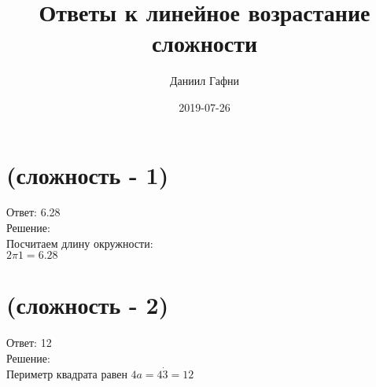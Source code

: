 \documentclass{article}%
\title{Ответы к линейное возрастание сложности}%
\author{Даниил Гафни}%
\date{2019{-}07{-}26}%
\begin{document}
%
\normalsize%
\maketitle%
\section{(сложность {-} 1)}%
\label{sec:( {-} 1)}%
\hspace{3ex} Ответ: 6.28 \\%
%
\hspace*{3ex} Решение: \\%
Посчитаем длину окружности: \\ $2 \pi 1 = 6.28$

%
\section{(сложность {-} 2)}%
\label{sec:( {-} 2)}%
\hspace{3ex} Ответ: 12 \\%
%
\hspace*{3ex} Решение: \\%
Периметр квадрата равен $4a = 4 \dot 3 = 12$ 

%
\end{document}
